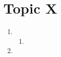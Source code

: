 \documentclass{article}
\title{}
\author{Haad Bhutta}
\date{}
\begin{document}
\maketitle

\section{Topic X}
\begin{enumerate}
  \item
    \begin{enumerate}
    \item
    \end{enumerate}
  \item
\end{enumerate}

\subsection{}
\end{document}
